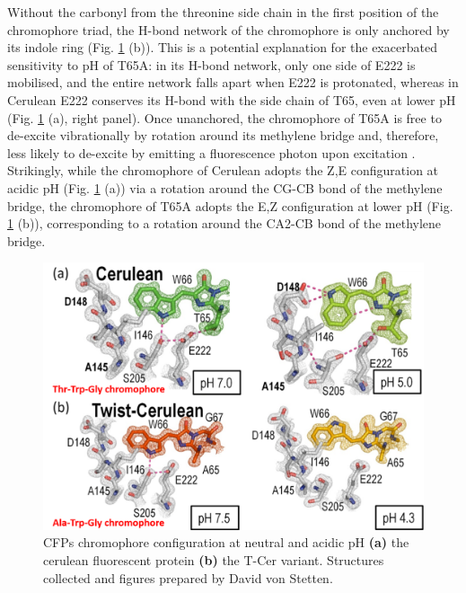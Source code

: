 Without the carbonyl from the threonine side chain in the first position of the chromophore triad, the H-bond network of the chromophore is only anchored by its indole ring (Fig. \ref{fig:Cerulean_pH} (b)). This is a potential explanation for the exacerbated sensitivity to pH of T65A: in its H-bond network, only one side of E222 is mobilised, and the entire network falls apart when E222 is protonated, whereas in Cerulean E222 conserves its H-bond with the side chain of T65, even at lower pH (Fig. \ref{fig:Cerulean_pH} (a), right panel). Once unanchored, the chromophore of T65A is free to de-excite vibrationally by rotation around its methylene bridge and, therefore, less likely to de-excite by emitting a fluorescence photon upon excitation \parencite{gotthardChromophoreIsomerStabilization2017a}. Strikingly, while the chromophore of Cerulean adopts the Z,E configuration at acidic pH (Fig. \ref{fig:Cerulean_pH} (a)) via a rotation around the CG-CB bond of the methylene bridge, the chromophore of T65A adopts the E,Z configuration at lower pH (Fig. \ref{fig:Cerulean_pH} (b)), corresponding to a rotation around the CA2-CB bond of the methylene bridge.
\begin{figure}[H] %
    \centering
    \includegraphics[width=\textwidth]{images/T-Cer/Cer-Tcer_pH.pdf}
    \hfill
    \caption{CFPs chromophore configuration at neutral and acidic pH \textbf{(a)} the cerulean fluorescent protein \textbf{(b)} the T-Cer variant. Structures collected and figures prepared by David von Stetten.}
    \label{fig:Cerulean_pH}
\end{figure}

